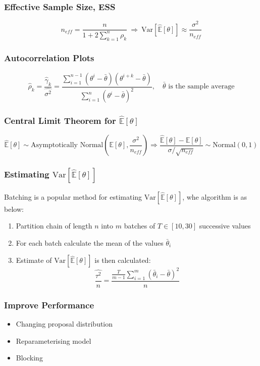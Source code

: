 \documentclass[12pt]{article}
\theoremstyle{definition}
\newcommand{\Expect}[1]{\mathbb{E}\left[#1\right]}
\newcommand{\Var}[1]{\text{Var}\left[#1\right]}
\newcommand{\MonteCarlo}[1]{\hat{\mathbb{E}}\left[#1\right]}
\begin{document}
        \subsubsection*{Effective Sample Size, ESS}
        $$n_{eff} = \frac{n}{1+ 2\sum_{k=1}^n\rho_k} \ \Rightarrow\ \Var{\MonteCarlo{\theta}} \approx \frac{\sigma^2}{n_{eff}}$$
        \subsubsection*{Autocorrelation Plots}
        $$\hat{\rho}_k = \frac{\hat{\gamma}_k}{\hat{\sigma^2}} = \frac{\sum_{i=1}^{n-1} \left(\theta^i - \bar{\theta}\right)\left(\theta^{i+k} - \bar{\theta}\right)}{\sum_{i=1}^n\left(\theta^i - \bar{\theta}\right)^2}, \quad \bar{\theta} \text{ is the sample average}$$
        \subsubsection*{Central Limit Theorem for $\MonteCarlo{\theta}$}
        $$\MonteCarlo{\theta} \sim \text{Asymptotically Normal}\left(\Expect{\theta}, \frac{\sigma^2}{n_{eff}}\right) \Rightarrow \frac{\MonteCarlo{\theta} - \Expect{\theta}}{\sigma/\sqrt{n_{eff}}} \sim \text{Normal}(0,1)$$
        \subsubsection*{Estimating $\Var{\MonteCarlo{\theta}}$}
        Batching is a popular method for estimating $\Var{\MonteCarlo{\theta}}$, whe algorithm is as below:
        \begin{enumerate}
            \item Partition chain of length $n$ into $m$ batches of $T\in [10,30]$ successive values
            \item For each batch calculate the mean of the values $\bar{\theta}_i$
            \item Estimate of $\Var{\MonteCarlo{\theta}}$ is then calculated:
                $$\hat{\frac{\tau^2}{n}} = \frac{\frac{T}{m-1}\sum_{i=1}^m\left(\bar{\theta}_i - \bar{\theta}\right)^2}{n}$$
        \end{enumerate}
        \subsubsection*{Improve Performance}
        \begin{itemize}
            \item Changing proposal distribution
            \item Reparameterising model
            \item Blocking
        \end{itemize}
    \newpage
\end{document}
